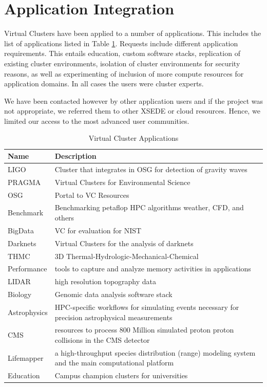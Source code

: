 \documentclass[sigconf,hyphens]{acmart}
\begin{document}
\section{Application Integration}\label{sec:application}

Virtual Clusters have been applied to a number of applications. This
includes the list of applications listed in Table \ref{tab:apps}.
Requests include different application requirements. This entails
education, custom software stacks, replication of existing cluster
environments, isolation of cluster environments for security reasons,
as well as experimenting of inclusion of more compute resources for
application domains. In all cases the users were cluster experts.

We have been contacted however by other application users and if the
project was not appropriate, we referred them to other XSEDE or cloud
resources. Hence, we limited our access to the most advanced user
communities.

\begin{table}

\caption{Virtual Cluster Applications}\label{tab:apps}

\begin{tabular}{ll}
\toprule
Name & Description\\
\midrule
LIGO & Cluster that integrates in OSG for detection of gravity waves \\
PRAGMA & Virtual Clusters for Environmental Science \\
OSG & Portal to VC Resources \\
Benchmark & Benchmarking petaflop HPC algorithms weather, CFD, and others \\
BigData & VC for evaluation for NIST \\
Darknets & Virtual Clusters for the analysis of darknets \\
THMC & 3D Thermal-Hydrologic-Mechanical-Chemical \\
Performance & tools to capture and analyze memory activities in applications\\
LIDAR & high resolution topography data \\
Biology & Genomic data analysis software stack \\
Astrophysics & HPC-specific workflows for simulating events necessary for precision astrophysical measurements \\
CMS & resources to process 800 Million simulated proton proton
collisions in the CMS detector \\
Lifemapper & a high-throughput species distribution (range)
modeling system and the main computational platform \\
Education & Campus champion clusters for universities \\ 
\bottomrule
\end{tabular}

\end{table}
\end{document}

